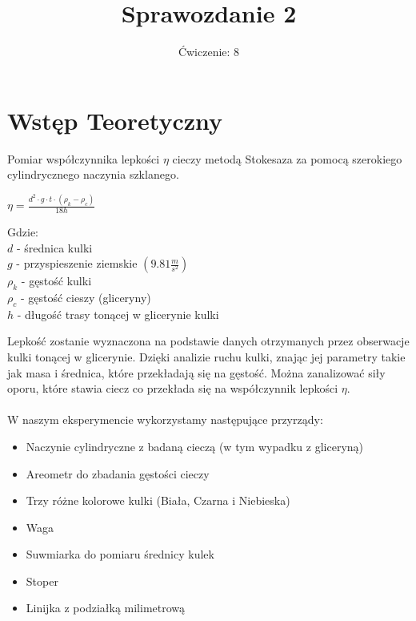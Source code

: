\documentclass{article}
\title{Sprawozdanie 2}
\author{
Ćwiczenie: 8}
\date{}
\begin{document}
\maketitle
\section{Wstęp Teoretyczny}
\par Pomiar współczynnika lepkości $\eta$ cieczy metodą Stokesaza za pomocą 
szerokiego cylindrycznego 
naczynia szklanego. \\
\begin{center}
    $
    \eta=\frac{d^{2}\cdot g\cdot t\cdot (\rho_{k}-\rho_{c})}{18h}
    $
    \begin{flushleft}
        Gdzie:\\
        $d$ - średnica kulki\\
        $g$ - przyspieszenie ziemskie $(9.81\frac{m}{s^{2}})$\\
        $\rho_{k}$ - gęstość kulki\\
        $\rho_{c}$ - gęstość cieszy (gliceryny)\\
        $h$ - długość trasy tonącej w glicerynie kulki
    \end{flushleft}
\end{center}
\par Lepkość zostanie wyznaczona na podstawie danych otrzymanych przez obserwacje kulki 
tonącej w glicerynie. Dzięki analizie ruchu kulki, znając jej parametry takie 
jak masa i średnica, które przekładają się na gęstość. Można zanalizować siły oporu,
które stawia ciecz co przekłada się na współczynnik lepkości $\eta$.\\ \\
W naszym eksperymencie wykorzystamy następujące przyrządy:\\
\begin{itemize}
    \item Naczynie cylindryczne z badaną cieczą (w tym wypadku z gliceryną)
    \item Areometr do zbadania gęstości cieczy
    \item Trzy różne kolorowe kulki (Biała, Czarna i Niebieska)
    \item Waga
    \item Suwmiarka do pomiaru średnicy kulek
    \item Stoper
    \item Linijka z podziałką milimetrową
\end{itemize}
\newpage
\end{document}
